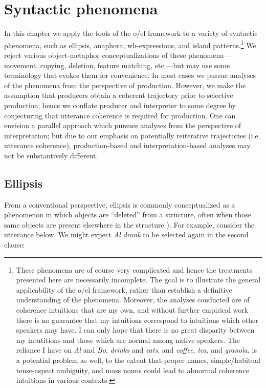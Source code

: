 \chapter{Syntactic phenomena}

In this chapter we apply the tools of the o/el framework to a variety of syntactic phenomena, such as ellipsis, anaphora, wh-expressions, and island patterns.\footnote{These phenomena are of course very complicated and hence the treatments presented here are necessarily incomplete. The goal is to illustrate the general applicability of the o/el framework, rather than establish a definitive understanding of the phenomena. Moreover, the analyses conducted are of coherence intuitions that are my own, and without further empirical work there is no guarantee that my intuitions correspond to intuitions which other speakers may have. I can only hope that there is no great disparity between my intutitions and those which are normal among native speakers. The reliance I have on \textit{Al} and \textit{Bo}, \textit{drinks} and \textit{eats}, and \textit{coffee}, \textit{tea}, and \textit{granola}, is a potential problem as well, to the extent that proper names, simple/habitual tense-aspect ambiguity, and mass nouns could lead to abnormal coherence intuitions in various contexts.} We reject various object-metaphor conceptualizations of these phenomena—movement, copying, deletion, feature matching, etc.—but may use some terminology that evokes them for convenience. In most cases we pursue analyses of the phenomena from the perspective of production. However, we make the assumption that producers obtain a coherent trajectory prior to selective production; hence we conflate producer and interpreter to some degree by conjecturing that utterance coherence is required for production. One can envision a parallel approach which pursues analyses from the perspective of interpretation; but due to our emphasis on potentially reiterative trajectories (i.e. utterance coherence), production-based and interpretation-based analyses may not be substantively different. 

\section{Ellipsis}

From a conventional perspective, ellipsis is commonly conceptualized as a phenomenon in which objects are “deleted” from a structure, often when those same objects are present elsewhere in the structure \citep{Merchant2001,Merchant2005,Merchant2013}). For example, consider the utterance below. We might expect \textit{Al drank} to be selected again in the second clause:

